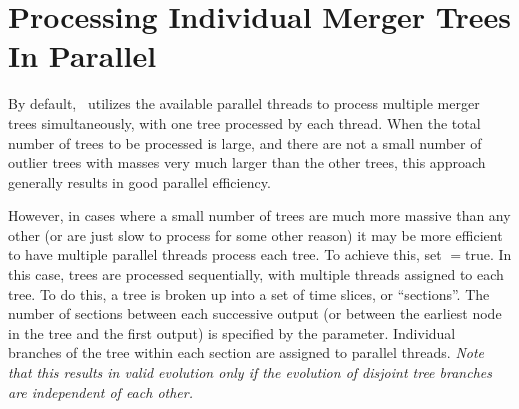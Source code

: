 \section{Processing Individual Merger Trees In Parallel}

By default, \glc\ utilizes the available parallel threads to process multiple merger trees simultaneously, with one tree processed by each thread. When the total number of trees to be processed is large, and there are not a small number of outlier trees with masses very much larger than the other trees, this approach generally results in good parallel efficiency.

However, in cases where a small number of trees are much more massive than any other (or are just slow to process for some other reason) it may be more efficient to have multiple parallel threads process each tree. To achieve this, set {\normalfont \ttfamily [treeEvolveSingleForest]}$=${\normalfont \ttfamily true}. In this case, trees are processed sequentially, with multiple threads assigned to each tree. To do this, a tree is broken up into a set of time slices, or ``sections''. The number of sections between each successive output (or between the earliest node in the tree and the first output) is specified by the {\normalfont \ttfamily [treeEvolveSingleForestSections]} parameter. Individual branches of the tree within each section are assigned to parallel threads. \emph{Note that this results in valid evolution only if the evolution of disjoint tree branches are independent of each other.}
